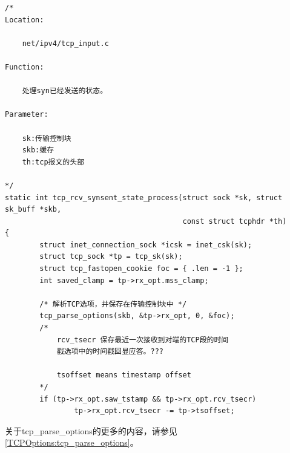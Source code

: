 \begin{verbatim}
/*
Location:

    net/ipv4/tcp_input.c

Function:

    处理syn已经发送的状态。

Parameter:

    sk:传输控制块
    skb:缓存
    th:tcp报文的头部

*/
static int tcp_rcv_synsent_state_process(struct sock *sk, struct sk_buff *skb,
                                         const struct tcphdr *th)
{
        struct inet_connection_sock *icsk = inet_csk(sk);
        struct tcp_sock *tp = tcp_sk(sk);
        struct tcp_fastopen_cookie foc = { .len = -1 };
        int saved_clamp = tp->rx_opt.mss_clamp;

        /* 解析TCP选项，并保存在传输控制块中 */
        tcp_parse_options(skb, &tp->rx_opt, 0, &foc);
        /*
            rcv_tsecr 保存最近一次接收到对端的TCP段的时间
            戳选项中的时间戳回显应答。???

            tsoffset means timestamp offset
        */
        if (tp->rx_opt.saw_tstamp && tp->rx_opt.rcv_tsecr)
                tp->rx_opt.rcv_tsecr -= tp->tsoffset;
\end{verbatim}

		关于tcp\_parse\_options的更多的内容，请参见\ref{TCPOptions:tcp_parse_options}。

